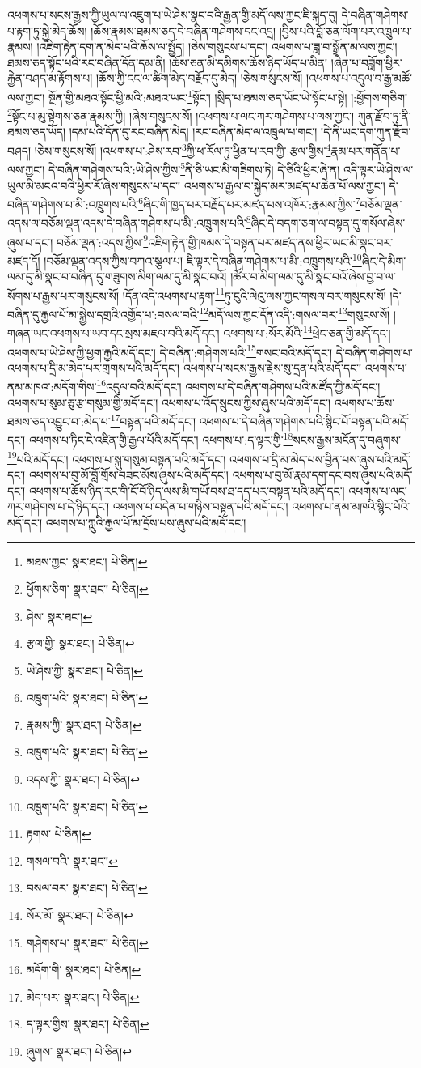 འཕགས་པ་སངས་རྒྱས་ཀྱི་ཡུལ་ལ་འཇུག་པ་ཡེ་ཤེས་སྣང་བའི་རྒྱན་གྱི་མདོ་ལས་ཀྱང་ཇི་སྐད་དུ། དེ་བཞིན་གཤེགས་པ་རྟག་ཏུ་སྐྱེ་མེད་ཆོས། །ཆོས་རྣམས་ཐམས་ཅད་དེ་བཞིན་གཤེགས་དང་འདྲ། །བྱིས་པའི་བློ་ཅན་ལོག་པར་འཁྲུལ་པ་རྣམས། །འཇིག་རྟེན་དག་ན་མེད་པའི་ཆོས་ལ་སྤྱོད། །ཅེས་གསུངས་པ་དང་། འཕགས་པ་ཟླ་བ་སྒྲོན་མ་ལས་ཀྱང་། ཐམས་ཅད་སྟོང་པའི་རང་བཞིན་དོན་དམ་ནི། །ཆོས་ཅན་མི་དམིགས་ཆོས་ཉིད་ཡོད་པ་མིན། །ཞེན་པ་བཟློག་ཕྱིར་རྐྱེན་བཤད་མ་རྟོགས་པ། །ཆོས་ཀྱི་ངང་ལ་ཚིག་མེད་བརྗོད་དུ་མེད། །ཅེས་གསུངས་སོ། །འཕགས་པ་འདུལ་བ་རྒྱ་མཚོ་ལས་ཀྱང་། སྔོན་གྱི་མཐའ་སྟོང་ཕྱི་མའི་:མཐའ་ཡང་\footnote{མཐས་ཀྱང་  སྣར་ཐང་།  པེ་ཅིན། }སྟོང་། །སྲིད་པ་ཐམས་ཅད་ཡོང་ཡེ་སྟོང་པ་སྟེ། །:ཕྱོགས་གཅིག་\footnote{ཕྱོགས་ཅིག་  སྣར་ཐང་།  པེ་ཅིན། }སྟོང་པ་མུ་སྟེགས་ཅན་རྣམས་ཀྱི། །ཞེས་གསུངས་སོ། །འཕགས་པ་ལང་ཀར་གཤེགས་པ་ལས་ཀྱང་། ཀུན་རྫོབ་ཏུ་ནི་ཐམས་ཅད་ཡོད། །དམ་པའི་དོན་དུ་རང་བཞིན་མེད། །རང་བཞིན་མེད་ལ་འཁྲུལ་པ་གང་། །དེ་ནི་ཡང་དག་ཀུན་རྫོབ་བཤད། །ཅེས་གསུངས་སོ། །འཕགས་པ་:ཤེས་རབ་\footnote{ཤེས་  སྣར་ཐང་། }ཀྱི་ཕ་རོལ་ཏུ་ཕྱིན་པ་རབ་ཀྱི་:རྩལ་གྱིས་\footnote{རྩལ་གྱི་  སྣར་ཐང་།  པེ་ཅིན། }རྣམ་པར་གནོན་པ་ལས་ཀྱང་། དེ་བཞིན་གཤེགས་པའི་:ཡེ་ཤེས་ཀྱིས་\footnote{ཡེ་ཤེས་ཀྱི་  སྣར་ཐང་།  པེ་ཅིན། }ནི་ཅི་ཡང་མི་གཟིགས་ཏེ། དེ་ཅིའི་ཕྱིར་ཞེ་ན། འདི་ལྟར་ཡེ་ཤེས་ལ་ཡུལ་མི་མངའ་བའི་ཕྱིར་རོ་ཞེས་གསུངས་པ་དང་། འཕགས་པ་རྒྱལ་བ་སྐྱེད་མར་མཛད་པ་ཆེན་པོ་ལས་ཀྱང་། དེ་བཞིན་གཤེགས་པ་མི་:འཁྲུགས་པའི་\footnote{འཁྲུག་པའི་  སྣར་ཐང་།  པེ་ཅིན། }ཞིང་གི་ཁྱད་པར་བརྗོད་པར་མཛད་པས་འཁོར་:རྣམས་ཀྱིས་\footnote{རྣམས་ཀྱི་  སྣར་ཐང་།  པེ་ཅིན། }བཅོམ་ལྡན་འདས་ལ་བཅོམ་ལྡན་འདས་དེ་བཞིན་གཤེགས་པ་མི་:འཁྲུགས་པའི་\footnote{འཁྲུག་པའི་  སྣར་ཐང་།  པེ་ཅིན། }ཞིང་དེ་བདག་ཅག་ལ་བསྟན་དུ་གསོལ་ཞེས་ཞུས་པ་དང་། བཅོམ་ལྡན་:འདས་ཀྱིས་\footnote{འདས་ཀྱི་  སྣར་ཐང་།  པེ་ཅིན། }འཇིག་རྟེན་གྱི་ཁམས་དེ་བསྟན་པར་མཛད་ནས་ཕྱིར་ཡང་མི་སྣང་བར་མཛད་དོ། །བཅོམ་ལྡན་འདས་ཀྱིས་བཀའ་སྩལ་པ། ཇི་ལྟར་དེ་བཞིན་གཤེགས་པ་མི་:འཁྲུགས་པའི་\footnote{འཁྲུག་པའི་  སྣར་ཐང་།  པེ་ཅིན། }ཞིང་དེ་མིག་ལམ་དུ་མི་སྣང་བ་བཞིན་དུ་གཟུགས་མིག་ལམ་དུ་མི་སྣང་བའོ། །ཚོར་བ་མིག་ལམ་དུ་མི་སྣང་བའོ་ཞེས་བྱ་བ་ལ་སོགས་པ་རྒྱས་པར་གསུངས་སོ། །དོན་འདི་འཕགས་པ་རྟག་\footnote{རྟགས་  པེ་ཅིན། }ཏུ་ངུའི་ལེའུ་ལས་ཀྱང་གསལ་བར་གསུངས་སོ། །དེ་བཞིན་དུ་རྒྱལ་པོ་མ་སྐྱེས་དགྲའི་འགྱོད་པ་:བསལ་བའི་\footnote{གསལ་བའི་  སྣར་ཐང་། }མདོ་ལས་ཀྱང་དོན་འདི་:གསལ་བར་\footnote{བསལ་བར་  སྣར་ཐང་།  པེ་ཅིན། }གསུངས་སོ། །གཞན་ཡང་འཕགས་པ་ཡབ་དང་སྲས་མཇལ་བའི་མདོ་དང་། འཕགས་པ་:སོར་མོའི་\footnote{སོར་མོ་  སྣར་ཐང་།  པེ་ཅིན། }ཕྲེང་ཅན་གྱི་མདོ་དང་། འཕགས་པ་ཡེ་ཤེས་ཀྱི་ཕྱག་རྒྱའི་མདོ་དང་། དེ་བཞིན་:གཤེགས་པའི་\footnote{གཤེགས་པ་  སྣར་ཐང་།  པེ་ཅིན། }གསང་བའི་མདོ་དང་། དེ་བཞིན་གཤེགས་པ་འཕགས་པ་དྲི་མ་མེད་པར་གྲགས་པའི་མདོ་དང་། འཕགས་པ་སངས་རྒྱས་རྗེས་སུ་དྲན་པའི་མདོ་དང་། འཕགས་པ་ནམ་མཁའ་:མདོག་གིས་\footnote{མདོག་གི་  སྣར་ཐང་།  པེ་ཅིན། }འདུལ་བའི་མདོ་དང་། འཕགས་པ་དེ་བཞིན་གཤེགས་པའི་མཛོད་ཀྱི་མདོ་དང་། འཕགས་པ་སུམ་ཅུ་རྩ་གསུམ་གྱི་མདོ་དང་། འཕགས་པ་འོད་སྲུངས་ཀྱིས་ཞུས་པའི་མདོ་དང་། འཕགས་པ་ཆོས་ཐམས་ཅད་འབྱུང་བ་:མེད་པ་\footnote{མེད་པར་  སྣར་ཐང་།  པེ་ཅིན། }བསྟན་པའི་མདོ་དང་། འཕགས་པ་དེ་བཞིན་གཤེགས་པའི་སྙིང་པོ་བསྟན་པའི་མདོ་དང་། འཕགས་པ་ཏིང་ངེ་འཛིན་གྱི་རྒྱལ་པོའི་མདོ་དང་། འཕགས་པ་:ད་ལྟར་གྱི་\footnote{ད་ལྟར་གྱིས་  སྣར་ཐང་།  པེ་ཅིན། }སངས་རྒྱས་མངོན་དུ་བཞུགས་\footnote{ཞུགས་  སྣར་ཐང་།  པེ་ཅིན། }པའི་མདོ་དང་། འཕགས་པ་སྐུ་གསུམ་བསྟན་པའི་མདོ་དང་། འཕགས་པ་དྲི་མ་མེད་པས་བྱིན་པས་ཞུས་པའི་མདོ་དང་། འཕགས་པ་བུ་མོ་བློ་གྲོས་བཟང་མོས་ཞུས་པའི་མདོ་དང་། འཕགས་པ་བུ་མོ་རྣམ་དག་དང་བས་ཞུས་པའི་མདོ་དང་། འཕགས་པ་ཆོས་ཉིད་རང་གི་ངོ་བོ་ཉིད་ལས་མི་གཡོ་བས་ཐ་དད་པར་བསྟན་པའི་མདོ་དང་། འཕགས་པ་ལང་ཀར་གཤེགས་པ་དེ་ཉིད་དང་། འཕགས་པ་བདེན་པ་གཉིས་བསྟན་པའི་མདོ་དང་། འཕགས་པ་ནམ་མཁའི་སྙིང་པོའི་མདོ་དང་། འཕགས་པ་ཀླུའི་རྒྱལ་པོ་མ་དྲོས་པས་ཞུས་པའི་མདོ་དང་། 